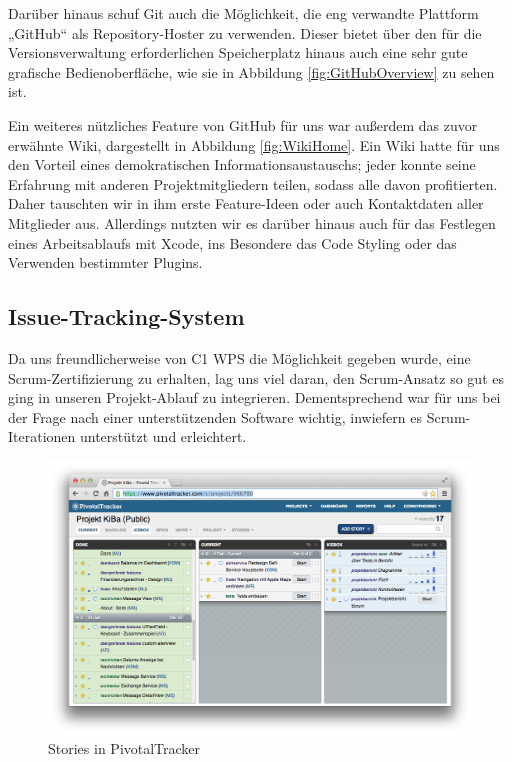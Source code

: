 	Darüber hinaus schuf Git auch die Möglichkeit, die eng verwandte Plattform „GitHub“ \cite{GitHub14} als Repository-Hoster zu verwenden. Dieser bietet über den für die Versionsverwaltung erforderlichen Speicherplatz hinaus auch eine sehr gute grafische Bedienoberfläche, wie sie in Abbildung \ref{fig:GitHubOverview} zu sehen ist.
	
	Ein weiteres nützliches Feature von GitHub für uns war außerdem das zuvor erwähnte Wiki, dargestellt in Abbildung \ref{fig:WikiHome}. Ein Wiki hatte für uns den Vorteil eines demokratischen Informationsaustauschs; jeder konnte seine Erfahrung mit anderen Projektmitgliedern teilen, sodass alle davon profitierten. Daher tauschten wir in ihm erste Feature-Ideen oder auch Kontaktdaten aller Mitglieder aus. Allerdings nutzten wir es darüber hinaus auch für das Festlegen eines Arbeitsablaufs mit Xcode, ins Besondere das Code Styling oder das Verwenden bestimmter Plugins.

\subsection{Issue-Tracking-System}
	Da uns freundlicherweise von C1 WPS die Möglichkeit gegeben wurde, eine Scrum-Zer\-ti\-fi\-zie\-rung zu erhalten, lag uns viel daran, den Scrum-Ansatz so gut es ging in unseren Projekt-Ablauf zu integrieren. Dementsprechend war für uns bei der Frage nach einer unterstützenden Software wichtig, inwiefern es Scrum-Iterationen unterstützt und erleichtert.
	
\begin{figure}[h]
	\centering
	\includegraphics[scale=.25]{Pictures/TrackerStories}
	\vspace{-.8cm}
	\caption{Stories in PivotalTracker\label{fig:TrackerStories}}
\end{figure}
	
